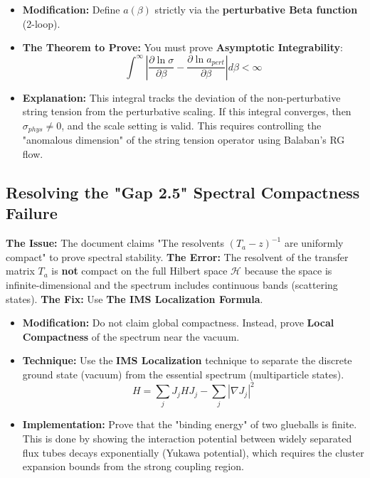 \begin{itemize}
    \item \textbf{Modification:} Define $a(\beta)$ strictly via the \textbf{perturbative Beta function} (2-loop).
    \item \textbf{The Theorem to Prove:} You must prove \textbf{Asymptotic Integrability}:
    \begin{equation}
    \int^\infty \left| \frac{\partial \ln \sigma}{\partial \beta} - \frac{\partial \ln a_{pert}}{\partial \beta} \right| d\beta < \infty
    \end{equation}
    \item \textbf{Explanation:} This integral tracks the deviation of the non-perturbative string tension from the perturbative scaling. If this integral converges, then $\sigma_{phys} \neq 0$, and the scale setting is valid. This requires controlling the "anomalous dimension" of the string tension operator using Balaban's RG flow.
\end{itemize}

\subsection{Resolving the "Gap 2.5" Spectral Compactness Failure}
\textbf{The Issue:} The document claims "The resolvents $(T_a - z)^{-1}$ are uniformly compact" to prove spectral stability.
\textbf{The Error:} The resolvent of the transfer matrix $T_a$ is \textbf{not} compact on the full Hilbert space $\mathcal{H}$ because the space is infinite-dimensional and the spectrum includes continuous bands (scattering states).
\textbf{The Fix:} Use \textbf{The IMS Localization Formula}.

\begin{itemize}
    \item \textbf{Modification:} Do not claim global compactness. Instead, prove \textbf{Local Compactness} of the spectrum near the vacuum.
    \item \textbf{Technique:} Use the \textbf{IMS Localization} technique to separate the discrete ground state (vacuum) from the essential spectrum (multiparticle states).
    \begin{equation}
    H = \sum_j J_j H J_j - \sum_j |\nabla J_j|^2
    \end{equation}
    \item \textbf{Implementation:} Prove that the "binding energy" of two glueballs is finite. This is done by showing the interaction potential between widely separated flux tubes decays exponentially (Yukawa potential), which requires the cluster expansion bounds from the strong coupling region.
\end{itemize}

